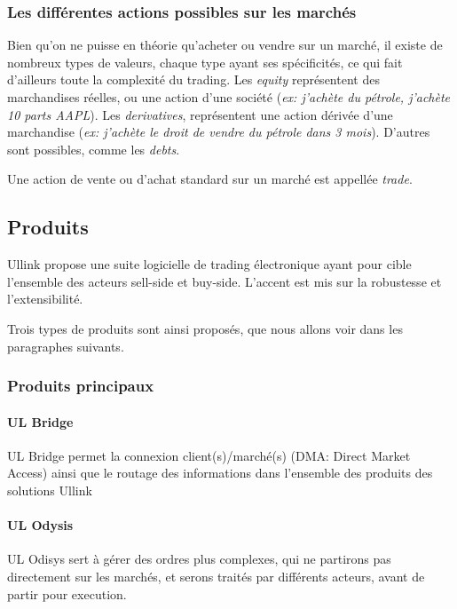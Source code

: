 \documentclass[a4paper, 12pt]{article}
\begin{document}
\subsubsection{Les différentes actions possibles sur les marchés}

Bien qu'on ne puisse en théorie qu'acheter ou vendre sur un marché, il existe de nombreux types de valeurs, chaque type ayant ses spécificités, ce qui fait d'ailleurs toute la complexité du trading. Les \emph{equity} représentent des marchandises réelles, ou une action d'une société (\emph{ex: j'achète du pétrole, j'achète 10 parts AAPL}). Les \emph{derivatives}, représentent une action dérivée d'une marchandise (\emph{ex: j'achète le droit de vendre du pétrole dans 3 mois}). D'autres sont possibles, comme les \emph{debts}.

Une action de vente ou d'achat standard sur un marché est appellée \emph{trade}.

\subsection{Produits}

Ullink propose une suite logicielle de trading électronique ayant pour cible l'ensemble des acteurs sell-side et buy-side. L'accent est mis sur la robustesse et l'extensibilité.

Trois types de produits sont ainsi proposés, que nous allons voir dans les paragraphes suivants.

\subsubsection{Produits principaux}

\paragraph{UL Bridge}

UL Bridge permet la connexion client(s)/marché(s) (DMA: Direct Market Access) ainsi que le routage des informations dans l'ensemble des produits des solutions Ullink

\paragraph{UL Odysis}

UL Odisys sert à gérer des ordres plus complexes, qui ne partirons pas directement sur les marchés, et serons traités par différents acteurs, avant de partir pour execution.
\end{document}

